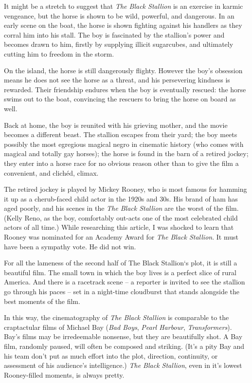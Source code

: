 It might be a stretch to suggest that \textit{The Black Stallion} is an exercise in karmic vengeance, but the horse is shown to be wild, powerful, and dangerous. In an early scene on the boat, the horse is shown fighting against his handlers as they corral him into his stall. The boy is fascinated by the stallion's power and becomes drawn to him, firstly by supplying illicit sugarcubes, and ultimately cutting him to freedom in the storm.

On the island, the horse is still dangerously flighty. However the boy's obsession means he does not see the horse as a threat, and his persevering kindness is rewarded. Their friendship endures when the boy is eventually rescued: the horse swims out to the boat, convincing the rescuers to bring the horse on board as well.

Back at home, the boy is reunited with his grieving mother, and the movie becomes a different beast. The stallion escapes from their yard; the boy meets possibly the most egregious magical negro in cinematic history (who comes with magical and totally gay horses); the horse is found in the barn of a retired jockey; they enter into a horse race for no obvious reason other than to give the film a convenient, and clichéd, climax.

The retired jockey is played by Mickey Rooney, who is most famous for hamming it up as a cherub-faced child actor in the 1920s and 30s. His brand of ham has aged poorly, and his scenes in the \textit{The Black Stallion} are the worst of the film. (Kelly Reno, as the boy, comfortably out-acts one of the most celebrated child actors of all time.) While researching this article, I was shocked to learn that Rooney was nominated for an Academy Award for \textit{The Black Stallion}. It must have been a sympathy vote. He did not win.

For all the lameness of the second half of The Black Stallion‘s plot, it is still a beautiful film. The small town in which the boy lives is a perfect slice of rural America. And there is a racetrack scene -- a reporter is invited to see the stallion go through his paces -- set in a night-time cloudburst that stands alongside the best moments of the film.

In this way, the cinematography of \textit{The Black Stallion} is comparable to the craptactular films of Michael Bay (\textit{Bad Boys}, \textit{Pearl Harbour}, \textit{Transformers}). Bay's films may be irredeemable nonsense, but they are beautifully shot. A Bay film, randomly paused, will often be composed and striking. (It's a pity Bay and his team don't put as much effort into the plot, direction, continuity, or assessment of his audience's intelligence.) \textit{The Black Stallion}, even in it's lowest Rooney-filled moments, is always pretty.

